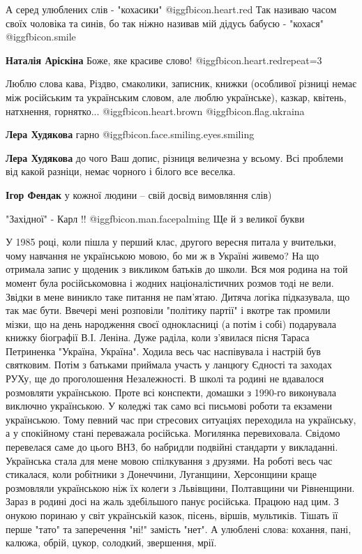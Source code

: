 \begin{itemize}
А серед улюблених слів - "кохасики" @igg{fbicon.heart.red}  Так називаю часом своїх чоловіка та синів,
бо так ніжно називав мій дідусь бабусю - "кохася" @igg{fbicon.smile} 

\begin{itemize} %
\textbf{Наталія Аріскіна} Боже, яке красиве слово! @igg{fbicon.heart.red}{repeat=3}
\end{itemize} %


Люблю слова кава, Різдво, смаколики, записник, книжки (особливої різниці немає
між російським та українським словом, але люблю українське), казкар, квітень,
натхнення, горнятко... @igg{fbicon.heart.brown}  @igg{fbicon.flag.ukraina}

\begin{itemize} %
\textbf{Лера Худякова} гарно @igg{fbicon.face.smiling.eyes.smiling} 

\textbf{Лера Худякова} до чого Ваш допис, різниця величезна у всьому. Всі проблеми від какой разніци, немає чорного і білого все веселка.

\textbf{Ігор Фендак} у кожної людини – свій досвід вимовляння слів)
\end{itemize} %

"Західної" - Карл !! @igg{fbicon.man.facepalming} 
Ще й з великої букви


У 1985 році, коли пішла у перший клас, другого вересня питала у вчительки, чому
навчання не українською мовою, бо ми ж в Україні живемо? На що отримала запис у
щоденик з викликом батьків до школи. Вся моя родина на той момент була
російськомовна і жодних націоналістичних розмов тоді не вели. Звідки в мене
виникло таке питання не пам'ятаю. Дитяча логіка підказувала, що так має бути.
Ввечері мені розповіли "політику партії" і вкотре так промили мізки, що на день
народження своєї однокласниці (а потім і собі) подарувала книжку біографії В.І.
Леніна. Дуже раділа, коли з'явилася пісня Тараса Петриненка "Україна, Україна".
Ходила весь час наспівувала і настрій був святковим. Потім з батьками приймала
участь у ланцюгу Єдності та заходах РУХу, ще до проголошення Незалежності. В
школі та родині не вдавалося розмовляти українською. Проте всі конспекти,
домашки з 1990-го виконувала виключно українською. У коледжі так само всі
письмові роботи та екзамени українською. Тому певний час при стресових
ситуаціях переходила на українську, а у спокійному стані переважала російська.
Могилянка перевиховала. Свідомо перевелася саме до цього ВНЗ, бо набридли
подвійні стандарти у викладанні. Українська стала для мене мовою спілкування з
друзями. На роботі весь час стикалася, коли робітники з Донеччини, Луганщини,
Херсонщини краще розмовляли українською ніж їх колеги з Львівщини, Полтавщини
чи Рівненщини. Зараз в родині досі на жаль здебільшого панує російська. Працюю
над цим. З онукою поринаю у світ українській казок, пісень, віршів, мультиків.
Тішать її перше "тато" та заперечення "ні!" замість "нет". А улюблені слова:
кохання, пані, калюжа, обрій, цукор, солодкий, звершення, мрії.


\end{itemize}
